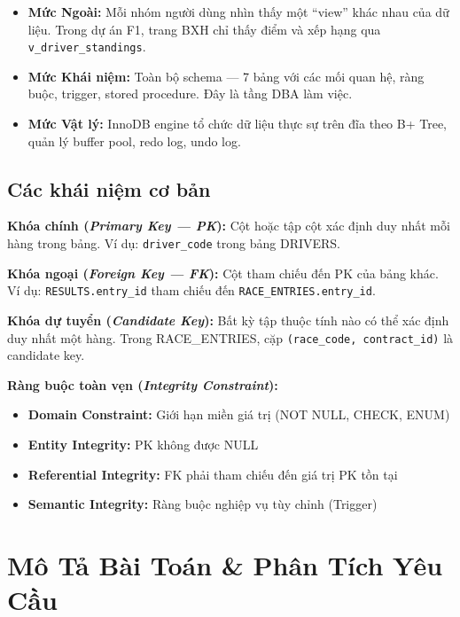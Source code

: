 \documentclass[13pt, a4paper]{report}
\begin{document}
\begin{itemize}[leftmargin=1.5cm]
  \item \textbf{Mức Ngoài:} Mỗi nhóm người dùng nhìn thấy một ``view'' khác nhau của dữ liệu. Trong dự án F1, trang BXH chỉ thấy điểm và xếp hạng qua \texttt{v\_driver\_standings}.
  \item \textbf{Mức Khái niệm:} Toàn bộ schema --- 7 bảng với các mối quan hệ, ràng buộc, trigger, stored procedure. Đây là tầng DBA làm việc.
  \item \textbf{Mức Vật lý:} InnoDB engine tổ chức dữ liệu thực sự trên đĩa theo B+ Tree, quản lý buffer pool, redo log, undo log.
\end{itemize}

\section{Các khái niệm cơ bản}

\textbf{Khóa chính (\textit{Primary Key --- PK}):} Cột hoặc tập cột xác định duy nhất mỗi hàng trong bảng. Ví dụ: \texttt{driver\_code} trong bảng DRIVERS.

\textbf{Khóa ngoại (\textit{Foreign Key --- FK}):} Cột tham chiếu đến PK của bảng khác. Ví dụ: \texttt{RESULTS.entry\_id} tham chiếu đến \texttt{RACE\_ENTRIES.entry\_id}.

\textbf{Khóa dự tuyển (\textit{Candidate Key}):} Bất kỳ tập thuộc tính nào có thể xác định duy nhất một hàng. Trong RACE\_ENTRIES, cặp \texttt{(race\_code, contract\_id)} là candidate key.

\textbf{Ràng buộc toàn vẹn (\textit{Integrity Constraint}):}
\begin{itemize}[leftmargin=1.5cm]
  \item \textbf{Domain Constraint:} Giới hạn miền giá trị (NOT NULL, CHECK, ENUM)
  \item \textbf{Entity Integrity:} PK không được NULL
  \item \textbf{Referential Integrity:} FK phải tham chiếu đến giá trị PK tồn tại
  \item \textbf{Semantic Integrity:} Ràng buộc nghiệp vụ tùy chỉnh (Trigger)
\end{itemize}

\chapter{Mô Tả Bài Toán \& Phân Tích Yêu Cầu}
\end{document}
